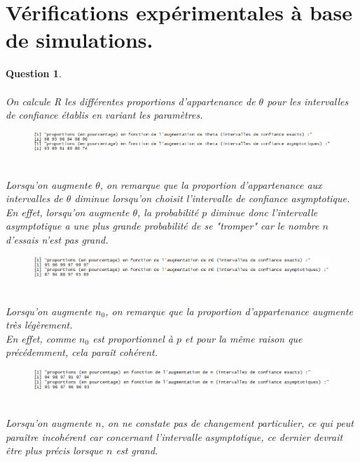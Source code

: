 \documentclass[a4paper,11pt]{article}
\newtheorem{exo4}{Question}
\begin{document}
\newpage

\section{Vérifications expérimentales à base de simulations.}

\begin{exo4} \ \\ \\
On calcule R les différentes proportions d'appartenance de $\theta$ pour les intervalles de confiance établis en variant les paramètres.
\begin{figure}[h]
\includegraphics[scale=0.85]{images/Q4_1_theta.PNG}
\end{figure} \ \\
Lorsqu'on augmente $\theta$, on remarque que la proportion d'appartenance aux intervalles de $\theta$ diminue lorsqu'on choisit l'intervalle de confiance asymptotique. \ \\
En effet, lorsqu'on augmente $\theta$, la probabilité $p$ diminue donc l'intervalle asymptotique a une plus grande probabilité de se "tromper" car le nombre $n$ d'essais n'est pas grand.
\begin{figure}[h]
\includegraphics[scale=0.85]{images/Q4_1_n0.PNG}
\end{figure} \ \\
Lorsqu'on augmente $n_{0}$, on remarque que la proportion d'appartenance augmente très légèrement. \ \\
En effet, comme $n_{0}$ est proportionnel à $p$ et pour la même raison que précédemment, cela paraît cohérent.
\begin{figure}[h]
\includegraphics[scale=0.85]{images/Q4_1_n.PNG}
\end{figure} \ \\
Lorsqu'on augmente $n$, on ne constate pas de changement particulier, ce qui peut paraître incohérent car concernant l'intervalle asymptotique, ce dernier devrait être plus précis lorsque $n$ est grand.

\end{exo4}
\end{document}
